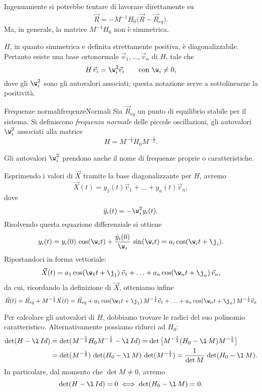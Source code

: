 \begin{oss}
	Ingenuamente si potrebbe tentare di lavorare direttamente su
	\[
		\ddot{\vec{R}} = -M^{-1}H_0\big(\vec{R}-\vec{R}_{eq}\big).
	\]
	Ma, in generale, la matrice \(M^{-1} H_0\) non è simmetrica.
\end{oss}
\noindent
\(H\), in quanto simmetrica e definita strettamente positiva, è diagonalizzabile.
Pertanto esiste una base ortonormale \(\vec{v}_1,\ldots,\vec{v}_n\) di \(H\), tale che
\[
	H\,\vec{v}_i = \w_i^2 \vec{v}_i \qquad\text{con }\w_i \neq 0,
\]
dove gli \(\w_i^2\) sono gli autovalori associati; questa notazione serve a sottolinearne la positività.

\begin{defn}{Frequenze normali}{freqenzeNormali}
	Sia \(\vec{R}_{eq}\) un punto di equilibrio stabile per il sistema.
	Si definiscono \emph{frequenza normale} delle piccole oscillazioni, gli autovalori \(\w_i^2\) associati alla matrice
	\[
		H=M^{-\frac{1}{2}}H_0 M^{-\frac{1}{2}}. 
	\]
\end{defn}

\begin{notz}
	Gli autovalori \(\w_i^2\) prendono anche il nome di frequenze proprie o caratteristiche.
\end{notz}

\noindent
Esprimendo i valori di \(\vec{X}\) tramite la base diagonalizzante per \(H\), avremo
\[
	\vec{X}(t) = y_1(t)\vec{v}_1 + \ldots + y_n(t)\vec{v}_n,
\]
dove
\[
	\ddot{y}_i(t) = -\w_i^2 y_i(t).
\]
Risolvendo questa equazione differenziale si ottiene
\[
	y_i(t) = y_i(0)\,\cos(\w_i t) + \frac{\dot{y}_i(0)}{\w_i}\,\sin(\w_i t) = a_i \cos(\w_i t + \j_i).
\]
Riportandoci in forma vettoriale:
\[
	\vec{X}(t) = a_1 \cos(\w_1 t + \j_1)\,\vec{v}_1 + \ldots + a_n \cos(\w_n t + \j_n)\,\vec{v}_n,
\]
da cui, ricordando la definizione di \(\vec{X}\), otteniamo infine
\[
	\vec{R}(t) = \vec{R}_{eq} + M^{-\frac{1}{2}}\vec{X}(t) = \vec{R}_{eq}+ a_1 \cos(\w_1 t + \j_1)\,M^{-\frac{1}{2}}\vec{v}_1 + \ldots + a_n \cos(\w_n t + \j_n)\,M^{-\frac{1}{2}}\vec{v}_n
\]

\begin{oss}
	Per calcolare gli autovalori di \(H\), dobbiamo trovare le radici del suo polinomio caratteristico. Alternativamente possiamo ridurci ad \(H_0\):
	\[
		\begin{split}
			\det(H-\l\,Id) & = \det(M^{-\frac{1}{2}} H_0 M^{-\frac{1}{2}} - \l\,Id) = \det\big[M^{-\frac{1}{2}}(H_0-\l\,M)M^{-\frac{1}{2}}\big]\\
			& = \det(M^{-\frac{1}{2}})\,\det(H_0-\l\,M)\,\det(M^{-\frac{1}{2}}) = \frac{1}{\det M}\,\det(H_0-\l\,M).
		\end{split}
	\]
	In particolare, dal momento che \(\det M \neq 0\), avremo
	\[
		\det(H-\l\,Id) = 0 \iff \det(H_0-\l\,M) = 0.
	\]
\end{oss}

